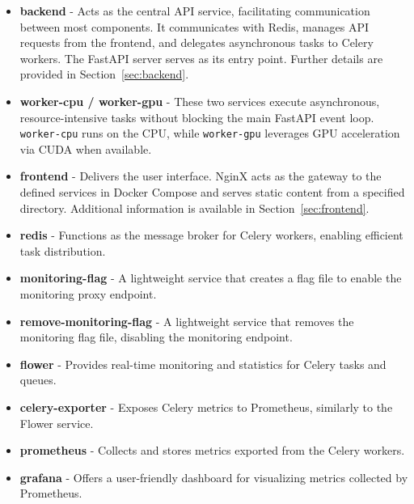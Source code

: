\begin{itemize}
    \item \textbf{backend} - Acts as the central API service, facilitating communication between most components. It communicates with Redis, manages API requests from the frontend, and delegates asynchronous tasks to Celery workers. The FastAPI server serves as its entry point. Further details are provided in Section~\ref{sec:backend}.
    \item \textbf{worker-cpu / worker-gpu} - These two services execute asynchronous, resource-intensive tasks without blocking the main FastAPI event loop. \texttt{worker-cpu} runs on the CPU, while \texttt{worker-gpu} leverages GPU acceleration via CUDA when available.
    \item \textbf{frontend} - Delivers the user interface. NginX acts as the gateway to the defined services in Docker Compose and serves static content from a specified directory. Additional information is available in Section~\ref{sec:frontend}.
    \item \textbf{redis} - Functions as the message broker for Celery workers, enabling efficient task distribution.
    \item \textbf{monitoring-flag} - A lightweight service that creates a flag file to enable the monitoring proxy endpoint.
    \item \textbf{remove-monitoring-flag} - A lightweight service that removes the monitoring flag file, disabling the monitoring endpoint.
    \item \textbf{flower} - Provides real-time monitoring and statistics for Celery tasks and queues.
    \item \textbf{celery-exporter} - Exposes Celery metrics to Prometheus, similarly to the Flower service.
    \item \textbf{prometheus} - Collects and stores metrics exported from the Celery workers.
    \item \textbf{grafana} - Offers a user-friendly dashboard for visualizing metrics collected by Prometheus.
\end{itemize}


